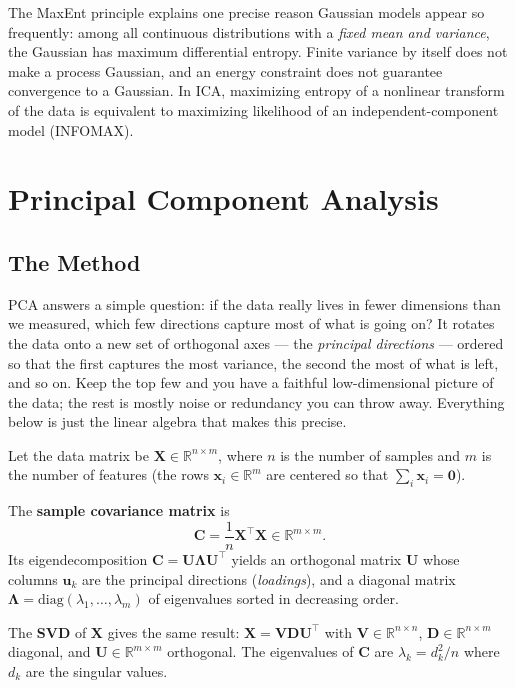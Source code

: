 \documentclass[11pt, oneside]{book}
\newcommand{\R}{\mathbb{R}}
\newcommand{\T}{^{\top}}
\begin{document}
\begin{intbox}
  The MaxEnt principle explains one precise reason Gaussian models appear so frequently:
  among all continuous distributions with a \emph{fixed mean and variance}, the Gaussian
  has maximum differential entropy. Finite variance by itself does not make a process
  Gaussian, and an energy constraint does not guarantee convergence to a Gaussian.
  In ICA, maximizing entropy of a nonlinear transform of the data is equivalent to
  maximizing likelihood of an independent-component model (INFOMAX).
\end{intbox}


\chapter{Principal Component Analysis}

\section{The Method}

PCA answers a simple question: if the data really lives in fewer dimensions than we
measured, which few directions capture most of what is going on? It rotates the data
onto a new set of orthogonal axes --- the \emph{principal directions} --- ordered so that
the first captures the most variance, the second the most of what is left, and so on.
Keep the top few and you have a faithful low-dimensional picture of the data; the rest is
mostly noise or redundancy you can throw away. Everything below is just the linear algebra
that makes this precise.

Let the data matrix be $\bm{X} \in \R^{n \times m}$, where $n$ is the number of samples
and $m$ is the number of features (the rows $\bm{x}_i \in \R^m$ are centered so that
$\sum_i \bm{x}_i = \bm{0}$).

The \textbf{sample covariance matrix} is
\[
  \bm{C} = \frac{1}{n}\bm{X}\T\bm{X} \in \R^{m \times m}.
\]
Its eigendecomposition $\bm{C} = \bm{U}\bm{\Lambda}\bm{U}\T$ yields an orthogonal
matrix $\bm{U}$ whose columns $\bm{u}_k$ are the principal directions (\emph{loadings}),
and a diagonal matrix $\bm{\Lambda} = \mathrm{diag}(\lambda_1,\ldots,\lambda_m)$ of
eigenvalues sorted in decreasing order.

The \textbf{SVD} of $\bm{X}$ gives the same result: $\bm{X} = \bm{V}\bm{D}\bm{U}\T$
with $\bm{V} \in \R^{n \times n}$, $\bm{D} \in \R^{n \times m}$ diagonal, and
$\bm{U} \in \R^{m \times m}$ orthogonal.
The eigenvalues of $\bm{C}$ are $\lambda_k = d_k^2/n$ where $d_k$ are the singular values.
\end{document}
